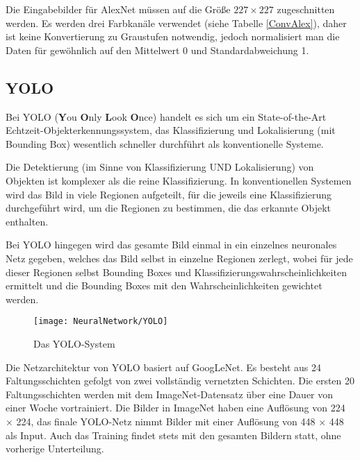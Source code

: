Die Eingabebilder für AlexNet müssen auf die Größe $227 \times 227$ zugeschnitten werden. Es werden drei Farbkanäle verwendet 
(siehe Tabelle \ref{ConvAlex}), daher ist keine Konvertierung zu Graustufen notwendig, jedoch normalisiert man die Daten für 
gewöhnlich auf den Mittelwert 0 und Standardabweichung 1.\cite{Alake:2020}\\

	
\subsection{YOLO}
Bei YOLO (\textbf{Y}ou \textbf{O}nly \textbf{L}ook \textbf{O}nce) handelt es sich um ein 
State-of-the-Art Echtzeit-Objekterkennungssystem, das Klassifizierung
und Lokalisierung (mit Bounding Box) wesentlich schneller durchführt als konventionelle Systeme.\cite{Redmon.17.02.2021}

Die Detektierung (im Sinne von Klassifizierung UND Lokalisierung) von Objekten ist komplexer als die reine Klassifizierung.
In konventionellen Systemen wird das Bild in viele Regionen aufgeteilt, für die jeweils eine Klassifizierung durchgeführt wird,
um die Regionen zu bestimmen, die das erkannte Objekt enthalten. \cite{Chablani:2017}

Bei YOLO hingegen wird das gesamte Bild einmal in ein einzelnes neuronales Netz gegeben, welches das Bild selbst in einzelne Regionen zerlegt,
wobei für jede dieser Regionen selbst Bounding Boxes und Klassifizierungswahrscheinlichkeiten ermittelt und die Bounding Boxes
mit den Wahrscheinlichkeiten gewichtet werden.

\begin{figure}[H]
	\begin{center}
		\texttt{[image: NeuralNetwork/YOLO]}
		\caption{Das YOLO-System} 
		\label{YOLO}
	\end{center}
\end{figure}

Die Netzarchitektur von YOLO basiert auf GoogLeNet. Es besteht aus 24 Faltungsschichten gefolgt von zwei vollständig vernetzten Schichten. Die ersten
20 Faltungsschichten werden mit dem ImageNet-Datensatz über eine Dauer von einer Woche vortrainiert. Die Bilder in ImageNet haben eine Auflösung von 
224 $\times$ 224, das finale YOLO-Netz nimmt Bilder mit einer Auflösung von 448 $\times$ 448 als Input. Auch das Training findet stets mit den gesamten Bildern
statt, ohne vorherige Unterteilung. \cite{Redmon.08.06.2015}\\

